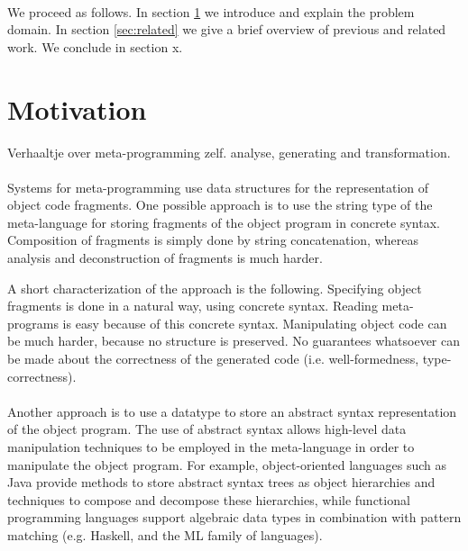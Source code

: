 \documentclass[a4paper,11pt]{article}
\begin{document}
\paragraph{}

We proceed as follows. In section \ref{sec:motivation} we introduce and explain
the problem domain. In section \ref{sec:related} we give a brief overview of
previous and related work. We conclude in section x.


\section{Motivation}\label{sec:motivation}

Verhaaltje over meta-programming zelf. analyse, generating and transformation.

\paragraph{}

Systems for meta-programming use data structures for the representation of
object code fragments. One possible approach is to use the string type of the
meta-language for storing fragments of the object program in concrete syntax.
Composition of fragments is simply done by string concatenation, whereas
analysis and deconstruction of fragments is much harder.

A short characterization of the approach is the following. Specifying object
fragments is done in a natural way, using concrete syntax. Reading
meta-programs is easy because of this concrete syntax. Manipulating object
code can be much harder, because no structure is preserved. No guarantees
whatsoever can be made about the correctness of the generated code (i.e.
well-formedness, type-correctness).

\paragraph{}

Another approach is to use a datatype to store an abstract syntax representation
of the object program. The use of abstract syntax allows high-level data
manipulation techniques to be employed in the meta-language in order to
manipulate the object program. For example, object-oriented languages such
as Java provide methods to store abstract syntax trees as object hierarchies
and techniques to compose and decompose these hierarchies, while functional
programming languages support algebraic data types in combination with pattern
matching (e.g. Haskell, and the ML family of languages).
\end{document}
